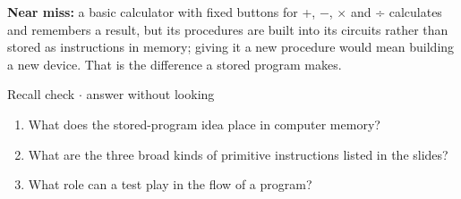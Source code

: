 \documentclass[11pt]{article}
\begin{document}
\begin{keepsection}
\begin{keepsection}
\begin{notebox}\textbf{Near miss:} a basic calculator with fixed buttons for +, \ensuremath{-}, \ensuremath{\times} and ÷ calculates and remembers a result, but its procedures are built into its circuits rather than stored as instructions in memory; giving it a new procedure would mean building a new device. That is the difference a stored program makes.\end{notebox}

\begin{recallbox}{Recall check \ensuremath{\cdot} answer without looking}
\begin{enumerate}
\item What does the stored-program idea place in computer memory?
\item What are the three broad kinds of primitive instructions listed in the slides?
\item What role can a test play in the flow of a program?
\end{enumerate}

\end{recallbox}
\end{keepsection}
\end{keepsection}
\end{document}
